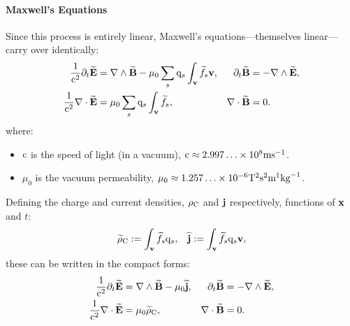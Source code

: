     \shortline

    \paragraph*{Maxwell's Equations} Since this process is entirely linear, Maxwell's equations---themselves linear---carry over identically:
    \begin{align}
        \frac{1}{\mathrm{c}^{2}}\partial_{t}\widetilde{\mathbf{E}}  &=  \nabla\wedge\widetilde{\mathbf{B}} - \mu_{0}\sum_{s}\mathrm{q}_{s}\int_{\mathbf{v}}\widetilde{f_{s}}\mathbf{v},  &
        \partial_{t}\widetilde{\mathbf{B}}  &=  - \nabla\wedge\widetilde{\mathbf{E}},  \\
        \frac{1}{\mathrm{c}^{2}}\nabla\cdot\widetilde{\mathbf{E}}  &=  \mu_{0}\sum_{s}\mathrm{q}_{s}\int_{\mathbf{v}}\widetilde{f_{s}},  &
        \nabla\cdot\widetilde{\mathbf{B}}  &=  0.
    \end{align}
    where:
    \begin{itemize}
        \item  $\mathrm{c}$ is the speed of light (in a vacuum), $\mathrm{c}  \approx  2.997\ldots\times 10^{8}\mathrm{m}\mathrm{s}^{- 1}$.
        \item  $\mu_{0}$ is the vacuum permeability, $\mu_{0}  \approx  1.257\ldots\times 10^{- 6}\mathrm{T}^{2}\mathrm{s}^{2}\mathrm{m}^{1}{\rm kg}^{- 1}$.
    \end{itemize}

    Defining the charge and current densities, $\rho_{\mathrm{C}}$ and $\mathbf{j}$ respectively, functions of $\mathbf{x}$ and $t$:
    \begin{align}
        \widetilde{\rho}_{\mathrm{C}}  :=  \int_{\mathbf{v}}\widetilde{f_{s}}\mathrm{q}_{s},  &&
               \widetilde{\mathbf{j}}  :=  \int_{\mathbf{v}}\widetilde{f_{s}}\mathrm{q}_{s}\mathbf{v},
    \end{align}
    these can be written in the compact forms:
    \begin{align}
        \frac{1}{\mathrm{c}^{2}}\partial_{t}\widetilde{\mathbf{E}}  &=  \nabla\wedge\widetilde{\mathbf{B}} - \mu_{0}\widetilde{\mathbf{j}},  &
        \partial_{t}\widetilde{\mathbf{B}}  &=  - \nabla\wedge\widetilde{\mathbf{E}},  \label{eqn:Maxwell's equations transient}  \\
        \frac{1}{\mathrm{c}^{2}}\nabla\cdot\widetilde{\mathbf{E}}  &=  \mu_{0}\widetilde{\rho}_{\mathrm{C}},  &
        \nabla\cdot\widetilde{\mathbf{B}}  &=  0.  \label{eqn:Maxwell's equations steady-state}
    \end{align}
    
